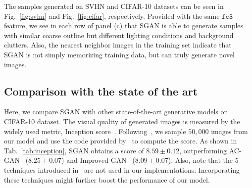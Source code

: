 \documentclass[10pt,twocolumn,letterpaper]{article}
\begin{document}
The samples generated on SVHN and CIFAR-10 datasets can be seen in Fig.~\ref{fig:svhn} and Fig.~\ref{fig:cifar}, respectively. Provided with the same $\texttt{fc3}$ feature, we see in each row of panel (c) that SGAN is able to generate samples with similar coarse outline but different lighting conditions and background clutters. Also, the nearest neighbor images in the training set indicate that SGAN is not simply memorizing training data, but can truly generate novel images. %

\subsection{Comparison with the state of the art}
Here, we compare SGAN with other state-of-the-art generative models on CIFAR-10 dataset. The visual quality of generated images is measured by the widely used metric, Inception score~\cite{salimans2016improved}. Following~\cite{salimans2016improved}, we sample $50, 000$ images from our model and use the code provided by~\cite{salimans2016improved} to compute the score. As shown in Tab.~\ref{tab:inception}, SGAN obtains a score of $8.59\pm 0.12$, outperforming AC-GAN~\cite{odena2017conditional} ($8.25\pm 0.07$) and Improved GAN~\cite{salimans2016improved} ($8.09\pm 0.07$). Also, note that the $5$ techniques introduced in~\cite{salimans2016improved} are not used in our implementations. Incorporating these techniques might further boost the performance of our model.
\end{document}
